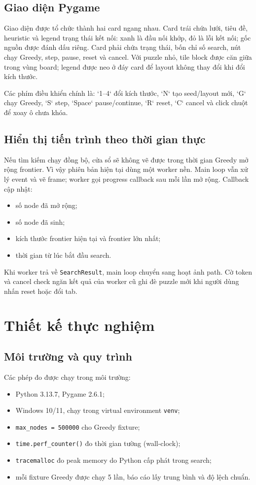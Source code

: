 \documentclass[12pt,a4paper]{article}
\newcommand{\code}[1]{\texttt{#1}}
\begin{document}
\subsection{Giao diện Pygame}
Giao diện được tổ chức thành hai card ngang nhau. Card trái chứa lưới, tiêu đề, heuristic và legend trạng thái kết nối: xanh là đầu nối khớp, đỏ là lỗi kết nối; gốc nguồn được đánh dấu riêng. Card phải chứa trạng thái, bốn chỉ số search, nút chạy Greedy, step, pause, reset và cancel. Với puzzle nhỏ, tile block được căn giữa trong vùng board; legend được neo ở đáy card để layout không thay đổi khi đổi kích thước.

Các phím điều khiển chính là: `1--4` đổi kích thước, `N` tạo seed/layout mới, `G` chạy Greedy, `S` step, `Space` pause/continue, `R` reset, `C` cancel và click chuột để xoay ô chưa khóa.

\subsection{Hiển thị tiến trình theo thời gian thực}
Nếu tìm kiếm chạy đồng bộ, cửa sổ sẽ không vẽ được trong thời gian Greedy mở rộng frontier. Vì vậy phiên bản hiện tại dùng một worker nền. Main loop vẫn xử lý event và vẽ frame; worker gọi progress callback sau mỗi lần mở rộng. Callback cập nhật:
\begin{itemize}
  \item số node đã mở rộng;
  \item số node đã sinh;
  \item kích thước frontier hiện tại và frontier lớn nhất;
  \item thời gian từ lúc bắt đầu search.
\end{itemize}
Khi worker trả về \code{SearchResult}, main loop chuyển sang hoạt ảnh path. Cờ token và cancel check ngăn kết quả của worker cũ ghi đè puzzle mới khi người dùng nhấn reset hoặc đổi tab.

\section{Thiết kế thực nghiệm}
\subsection{Môi trường và quy trình}
Các phép đo được chạy trong môi trường:
\begin{itemize}
  \item Python 3.13.7, Pygame 2.6.1;
  \item Windows 10/11, chạy trong virtual environment \code{venv};
  \item \code{max\_nodes = 500000} cho Greedy fixture;
  \item \code{time.perf\_counter()} đo thời gian tường (wall-clock);
  \item \code{tracemalloc} đo peak memory do Python cấp phát trong search;
  \item mỗi fixture Greedy được chạy 5 lần, báo cáo lấy trung bình và độ lệch chuẩn.
\end{itemize}
\end{document}
